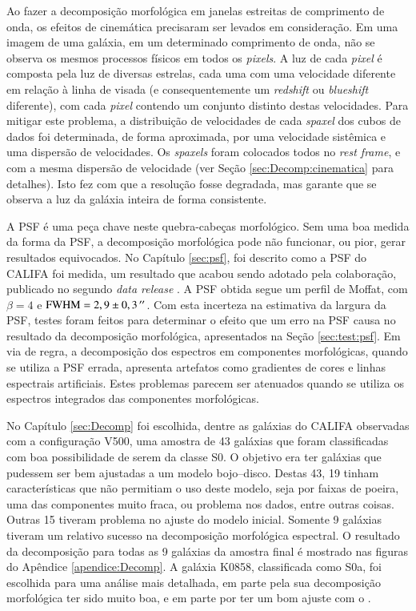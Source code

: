 Ao fazer a decomposição morfológica em janelas estreitas de comprimento de onda,
os efeitos de cinemática precisaram ser levados em consideração. Em uma imagem
de uma galáxia, em um determinado comprimento de onda, não se observa os mesmos
processos físicos em todos os {\em pixels}. A luz de cada {\em pixel} é composta
pela luz de diversas estrelas, cada uma com uma velocidade diferente em relação
à linha de visada (e consequentemente um {\em redshift} ou {\em blueshift}
diferente), com cada {\em pixel} contendo um conjunto distinto destas
velocidades. Para mitigar este problema, a distribuição de velocidades de cada
{\em spaxel} dos cubos de dados foi determinada, de forma aproximada, por uma
velocidade sistêmica e uma dispersão de velocidades. Os {\em spaxels} foram
colocados todos no {\em rest frame}, e com a mesma dispersão de velocidade (ver
Seção \ref{sec:Decomp:cinematica} para detalhes). Isto fez com que a resolução
fosse degradada, mas garante que se observa a luz da galáxia inteira de forma
consistente.

A PSF é uma peça chave neste quebra-cabeças morfológico. Sem uma boa medida da
forma da PSF, a decomposição morfológica pode não funcionar, ou pior, gerar
resultados equivocados. No Capítulo \ref{sec:psf}, foi descrito como  a PSF do
CALIFA foi medida, um resultado que acabou sendo adotado pela colaboração,
publicado no segundo {\em data release} \citep{GarciaBenito2015}. A PSF obtida
segue um perfil de Moffat, com $\beta = 4$ e $\mathrm{FWHM}=2,9 \pm 0,3\,^{\prime\prime}$.
Com esta incerteza na estimativa da largura da PSF, testes foram feitos para
determinar o efeito que um erro na PSF causa no resultado da decomposição
morfológica, apresentados na Seção \ref{sec:test:psf}. Em via de regra, a
decomposição dos espectros em componentes morfológicas, quando se utiliza a PSF
errada, apresenta artefatos como gradientes de cores e linhas espectrais
artificiais. Estes problemas parecem ser atenuados quando se utiliza os
espectros integrados das componentes morfológicas.

No Capítulo \ref{sec:Decomp} foi escolhida, dentre as galáxias do CALIFA
observadas com a configuração V500, uma amostra de 43 galáxias que foram
classificadas com boa possibilidade de serem da classe S0. O objetivo era ter
galáxias que pudessem ser bem ajustadas a um modelo bojo--disco. Destas 43, 19
tinham características que não permitiam o uso deste modelo, seja por faixas de
poeira, uma das componentes muito fraca, ou problema nos dados, entre outras
coisas. Outras 15 tiveram problema no ajuste do modelo inicial. Somente 9
galáxias tiveram um relativo sucesso na decomposição morfológica espectral. O
resultado da decomposição para todas as 9 galáxias da amostra final é mostrado
nas figuras do Apêndice \ref{apendice:Decomp}. A galáxia K0858, classificada
como S0a, foi escolhida para uma análise mais detalhada, em parte pela sua
decomposição morfológica ter sido muito boa, e em parte por ter um bom ajuste
com o \starlight.

